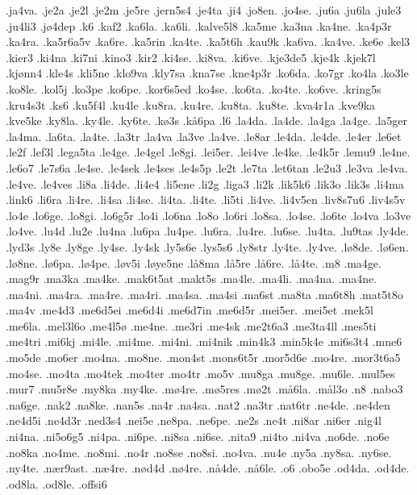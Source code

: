 .ja4va.
.je2a
.je2l
.je2m
.je5re
.jern5s4
.je4ta
.ji4
.jo8en.
.jo4se.
.ju6a
.ju6la
.jule3
.ju4li3
.j^^f84dep
.k6
.kaf2
.ka6la.
.ka6li.
.kalve5l8
.ka5me
.ka3na
.ka4ne.
.ka4p3r
.ka4ra.
.ka5r6a5v
.ka6re.
.ka5rin
.ka4te.
.ka5t6h
.kau9k
.ka6va.
.ka4ve.
.ke6e
.kel3
.kier3
.ki4na
.ki7ni
.kino3
.kir2
.ki4se.
.ki8va.
.ki6ve.
.kje3de5
.kje4k
.kjek7l
.kj^^f8nn4
.kle4s
.kli5ne
.klo9va
.kly7sa
.kna7se
.kne4p3r
.ko6da.
.ko7gr
.ko4la
.ko3le
.ko8le.
.kol5j
.ko3pe
.ko6pe.
.kor6s5ed
.ko4se.
.ko6ta.
.ko4te.
.ko6ve.
.kring5s
.kru4s3t
.ks6
.ku5f4l
.ku4le
.ku8ra.
.ku4re.
.ku8ta.
.ku8te.
.kva4r1a
.kve9ka
.kve5ke
.ky8la.
.ky4le.
.ky6te.
.k^^f83s
.k^^e56pa
.l6
.la4da.
.la4de.
.la4ga
.la4ge.
.la5ger
.la4ma.
.la6ta.
.la4te.
.la3tr
.la4va
.la3ve
.la4ve.
.le8ar
.le4da.
.le4de.
.le4er
.le6et
.le2f
.lef3l
.lega5ta
.le4ge.
.le4gel
.le8gi.
.lei5er.
.lei4ve
.le4ke.
.le4k5r
.lemu9
.le4ne.
.le6o7
.le7s6a
.le4se.
.le4sek
.le4ses
.le4s5p
.le2t
.le7ta
.let6tan
.le2u3
.le3va
.le4va.
.le4ve.
.le4ves
.li8a
.li4de.
.li4e4
.li5ene
.li2g
.liga3
.li2k
.lik5k6
.lik3o
.lik3s
.li4ma
.link6
.li6ra
.li4re.
.li4sa
.li4se.
.li4ta.
.li4te.
.li5ti
.li4ve.
.li4v5en
.liv8s7u6
.liv4s5v
.lo4e
.lo6ge.
.lo8gi.
.lo6g5r
.lo4i
.lo6na
.lo8o
.lo6ri
.lo8sa.
.lo4se.
.lo6te
.lo4va
.lo3ve
.lo4ve.
.lu4d
.lu2e
.lu4na
.lu6pa
.lu4pe.
.lu6ra.
.lu4re.
.lu6se.
.lu4ta.
.lu9tas
.ly4de.
.lyd3s
.ly8e
.ly8ge
.ly4se.
.ly4sk
.ly5s6e
.lys5s6
.ly8str
.ly4te.
.ly4ve.
.l^^f88de.
.l^^f86en.
.l^^f88ne.
.l^^f86pa.
.l^^f84pe.
.l^^f8v5i
.l^^f8ye5ne
.l^^e58ma
.l^^e55re
.l^^e56re.
.l^^e54te.
.m8
.ma4ge.
.mag9r
.ma3ka
.ma4ke.
.mak6t5at
.makt5s
.ma4le.
.ma4li.
.ma4na.
.ma4ne.
.ma4ni.
.ma4ra.
.ma4re.
.ma4ri.
.ma4sa.
.ma4si
.ma6st
.ma8ta
.ma6t8h
.mat5t8o
.ma4v
.me4d3
.me6d5ei
.me6d4i
.me6d7in
.me6d5r
.mei5er.
.mei5et
.mek5l
.me6la.
.mel3l6o
.me4l5^^f8
.me4ne.
.me3ri
.me4sk
.me2t6a3
.me3ta4ll
.mes5ti
.me4tri
.mi6kj
.mi4le.
.mi4me.
.mi4ni.
.mi4nik
.min4k3
.min5k4e
.mi6s3t4
.mne6
.mo5de
.mo6er
.mo4na.
.mo8ne.
.mon4st
.mons6t5r 
.mor5d6e
.mo4re.
.mor3t6a5
.mo4se.
.mo4ta
.mo4tek
.mo4ter
.mo4tr
.mo5v
.mu8ga
.mu8ge.
.mu6le.
.mul5es
.mur7
.mu5r8e
.my8ka
.my4ke.
.m^^f84re.
.m^^f85res
.m^^f82t
.m^^e56la.
.m^^e5l3o
.n8
.nabo3
.na6ge.
.nak2
.na8ke.
.nan5s
.na4r
.na4sa.
.nat2
.na3tr
.nat6tr
.ne4de.
.ne4den
.ne4d5i
.ne4d3r
.ned3s4
.nei5e
.ne8pa.
.ne6pe.
.ne2s
.ne4t
.ni8ar
.ni6er
.nig4l
.ni4na.
.ni5o6g5
.ni4pa.
.ni6pe.
.ni8sa
.ni6se.
.nita9
.ni4to
.ni4va
.no6de.
.no6e
.no8ka
.no4me.
.no8mi.
.no4r
.no8se
.no8si.
.no4va.
.nu4e
.ny5a
.ny8sa.
.ny6se.
.ny4te.
.n^^e6r9ast.
.n^^e64re.
.n^^f8d4d
.n^^f84re.
.n^^e54de.
.n^^e56le.
.o6
.obo5e
.od4da.
.od4de.
.od8la.
.od8le.
.offsi6
